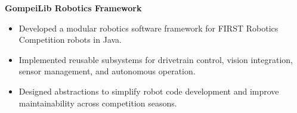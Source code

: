 \textbf{GompeiLib Robotics Framework}
\begin{itemize}
  \item Developed a modular robotics software framework for FIRST Robotics Competition robots in Java.
  \item Implemented reusable subsystems for drivetrain control, vision integration, sensor management, and autonomous operation.
  \item Designed abstractions to simplify robot code development and improve maintainability across competition seasons.
\end{itemize}

